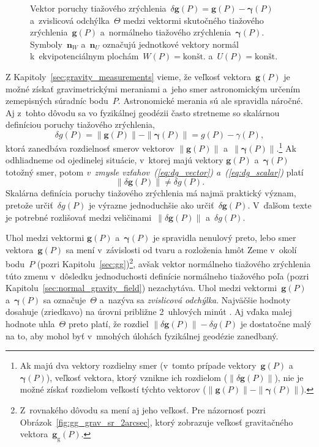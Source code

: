 \documentclass[a4paper,12pt]{book}
\newcommand{\gidx}{\mathrm g}
\let\vec\mathbf
\begin{document}
\begin{figure}[bt]
\centering

\caption{Vektor poruchy tiažového zrýchlenia~$\delta \vec g(P) = \vec g(P) 
- \boldsymbol\gamma(P)$ a~zvislicová odchýlka~$\Theta$ medzi vektormi 
skutočného tiažového zrýchlenia~$\vec g(P)$ a~normálneho tiažového 
zrýchlenia~$\boldsymbol\gamma(P)$.  Symboly~$\vec n_W$ a~$\vec n_U$ označujú 
jednotkové vektory normál k~ekvipotenciálnym plochám~$W(P) 
= \textrm{kon\v{s}t.}$ a~$U(P) = \textrm{kon\v{s}t.}$}
\label{fig:gravity_disturbance}
\end{figure}

Z Kapitoly~\ref{sec:gravity_measurements} vieme, že veľkosť vektora~$\vec g(P)$ 
je možné získať gravimetrickými meraniami a~jeho smer astronomickým určením 
zemepisných súradníc bodu~$P$.  Astronomické merania sú ale spravidla náročné.  
Aj z~tohto dôvodu sa vo fyzikálnej geodézii často stretneme so skalárnou 
definíciou poruchy tiažového zrýchlenia,
%
\begin{equation}
\label{eq:dg_scalar}
\delta g(P) = \| \vec g(P) \| - \| \boldsymbol \gamma(P) \| = g(P) 
- \gamma(P){,}
\end{equation}
%
ktorá zanedbáva rozdielnosť smerov vektorov $\| \vec g(P) \|$ a~$\| \boldsymbol 
\gamma(P) \|$.\footnote{Ak majú dva vektory rozdielny smer (v~tomto prípade 
vektory~$\vec g(P)$ a~$\boldsymbol \gamma(P)$), veľkosť vektora, ktorý vznikne 
ich rozdielom ($\| \delta \vec g(P) \|$), nie je možné získať rozdielom 
veľkostí týchto vektorov ($\| \vec g(P) \| - \| \boldsymbol \gamma(P) \|$).}  
Ak odhliadneme od ojedinelej situácie, v~ktorej majú vektory $\vec g(P)$ 
a~$\boldsymbol{\gamma}(P)$ totožný smer, potom \emph{v~zmysle 
vzťahov~(\ref{eq:dg_vector}) a~(\ref{eq:dg_scalar})} platí
%
\begin{equation}
\| \delta \vec g(P) \| \neq \delta g(P){.}
\end{equation}
%
Skalárna definícia poruchy tiažového zrýchlenia má najmä praktický význam, 
pretože určiť~$\delta g(P)$ je výrazne jednoduchšie ako určiť~$\delta \vec 
g(P)$.  V~ďalšom texte je potrebné rozlišovať medzi veličinami~$\| \delta \vec 
g(P) \|$ a~$\delta g(P)$.

Uhol medzi vektormi $\vec g(P)$ a~$\boldsymbol{\gamma}(P)$ je spravidla 
nenulový preto, lebo smer vektora~$\vec g(P)$ sa mení v~závislosti od tvaru 
a rozloženia hmôt Zeme v~okolí bodu~$P$ (pozri 
Kapitolu~\ref{sec:gg})\footnote{Z~rovnakého dôvodu sa mení aj jeho veľkosť.  
Pre názornosť pozri Obrázok~\ref{fig:gg_grav_sr_2arcsec}, ktorý zobrazuje 
veľkosť gravitačného vektora~$\vec g_\gidx(P)$.}, avšak vektor normálneho 
tiažového zrýchlenia túto zmenu v~dôsledku jednoduchosti definície normálneho 
tiažového poľa (pozri Kapitolu~\ref{sec:normal_gravity_field}) nezachytáva.  
Uhol medzi vektormi~$\vec g(P)$ a~$\boldsymbol \gamma(P)$ sa označuje~$\Theta$ 
a~nazýva sa \emph{zvislicová odchýlka}.  Najväčšie hodnoty dosahuje (zriedkavo) 
na úrovni približne 2~uhlových minút \parencite{GGMplus}.  Aj vďaka malej 
hodnote uhla~$\Theta$ preto platí, že rozdiel $\| \delta \vec g(P) \| - \delta 
g(P)$ je dostatočne malý na to, aby mohol byť v~mnohých úlohách fyzikálnej 
geodézie zanedbaný.
\end{document}

